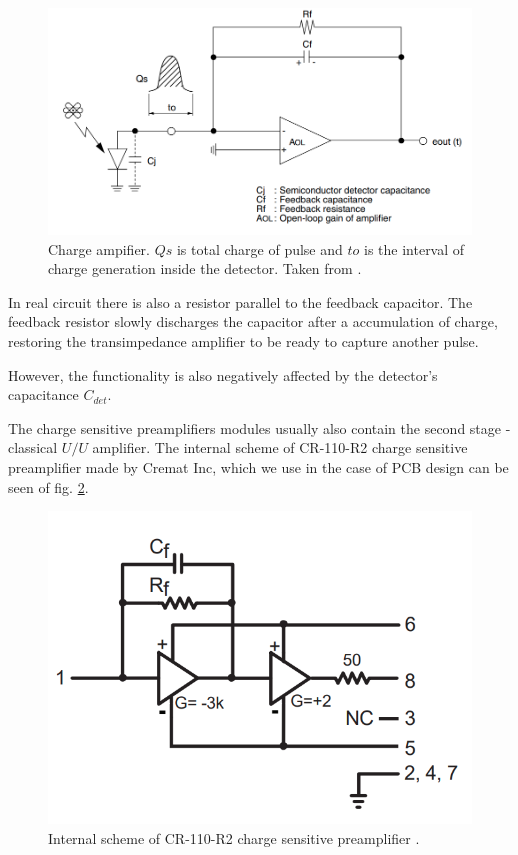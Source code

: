 \begin{figure}[H]
 \centering
 \includegraphics[scale=0.4, angle = 0]{./pictures/champlifier.png}
 \caption{Charge ampifier. $Qs$ is total charge of pulse and $to$ is the interval of charge generation inside the detector. Taken from \cite{charge}.}
 \label{trans}
 
\end{figure}



\par
In real circuit there is also a resistor parallel to the feedback capacitor. The feedback resistor slowly discharges the capacitor after a accumulation of charge, restoring the transimpedance amplifier to be ready to capture another pulse.  


However, the functionality is also negatively affected by the detector's capacitance $C_{det}$.

\par
The charge sensitive preamplifiers modules usually also contain the second stage - classical $U/U$ amplifier. The internal scheme of CR-110-R2 charge sensitive preamplifier made by Cremat Inc, which we use in the case of PCB design can be seen of fig. \ref{internal}.

\par

\begin{figure}[H]
 \centering
 \includegraphics[scale=0.35, angle = 0]{./pictures/CRpreamp.png}
 \caption{Internal scheme of CR-110-R2 charge sensitive preamplifier \cite{cr110}.}
 \label{internal}
 
\end{figure}

